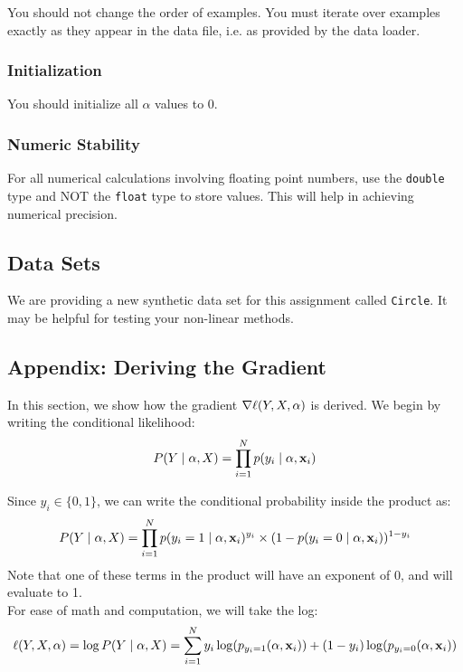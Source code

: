 \documentclass[11pt]{article}
\newcommand{\va}{{\bf \alpha}}
\newcommand{\vxi}{{\bf x}_i}
\newcommand{\yi}{y_i}
\newcommand{\code}[1]{{\footnotesize \tt #1}}
\begin{document}
You should not change the order of examples. You must iterate over examples exactly as they appear in the data file, i.e. as provided by the data loader.




\subsubsection{Initialization}

You should initialize all $\alpha$ values to 0.


\subsubsection{Numeric Stability}


For all numerical calculations involving floating point numbers, use the {\tt double} type and NOT the {\tt float} type to store values.
This will help in achieving numerical precision.


\subsection{Data Sets}
We are providing a new synthetic data set for this assignment called \code{Circle}. It may be helpful for testing your non-linear methods.



\subsection{Appendix: Deriving the Gradient}

In this section, we show how the gradient $\nabla \ell(Y,X,\va)$ is derived.
We begin by writing the conditional likelihood:
\begin{equation}
P(Y \mid \va, X) = \prod_{i=1}^N{p(\yi \mid \va, \vxi)}
\end{equation}

Since $\yi \in \{ 0,1 \}$, we can write the conditional probability inside the product as:
\begin{equation}
P(Y \mid \va, X) = \prod_{i=1}^N{ p(\yi=1 \mid \va, \vxi)^{\yi} \times (1-p(\yi=0 \mid \va, \vxi))^{1-\yi}}
\end{equation}
Note that one of these terms in the product will have an exponent of 0, and will evaluate to 1.\\

For ease of math and computation, we will take the log:
\begin{equation}
\ell(Y,X,\va) = \log P(Y \mid \va, X) = \sum_{i=1}^N{ \yi \log(p_{\yi=1}(\va, \vxi)) + (1-\yi)\log(p_{\yi=0}(\va, \vxi))}
\end{equation}
\end{document}
